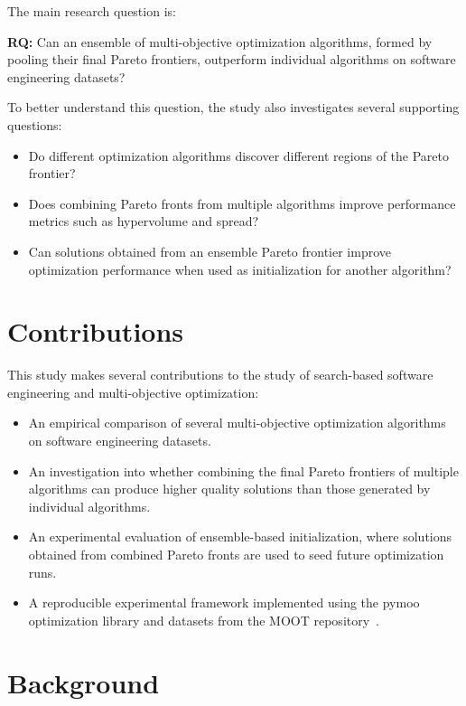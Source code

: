 \documentclass[sigconf,authorversion,nonacm]{acmart}
\begin{document}
The main research question is:

\textbf{RQ:} Can an ensemble of multi-objective optimization algorithms, 
formed by pooling their final Pareto frontiers, outperform individual 
algorithms on software engineering datasets?

To better understand this question, the study also investigates several 
supporting questions:

\begin{itemize}
\item Do different optimization algorithms discover different regions 
of the Pareto frontier?
\item Does combining Pareto fronts from multiple algorithms improve 
performance metrics such as hypervolume and spread?
\item Can solutions obtained from an ensemble Pareto frontier improve 
optimization performance when used as initialization for another algorithm?
\end{itemize}

\section{Contributions}

This study makes several contributions to the study of search-based 
software engineering and multi-objective optimization:

\begin{itemize}
\item An empirical comparison of several multi-objective optimization 
algorithms on software engineering datasets.

\item An investigation into whether combining the final Pareto frontiers 
of multiple algorithms can produce higher quality solutions than those 
generated by individual algorithms.

\item An experimental evaluation of ensemble-based initialization, 
where solutions obtained from combined Pareto fronts are used to seed 
future optimization runs.

\item A reproducible experimental framework implemented using the 
pymoo optimization library and datasets from the MOOT repository~\cite{menzies2025moot}.
\end{itemize}

\section{Background}
\end{document}
